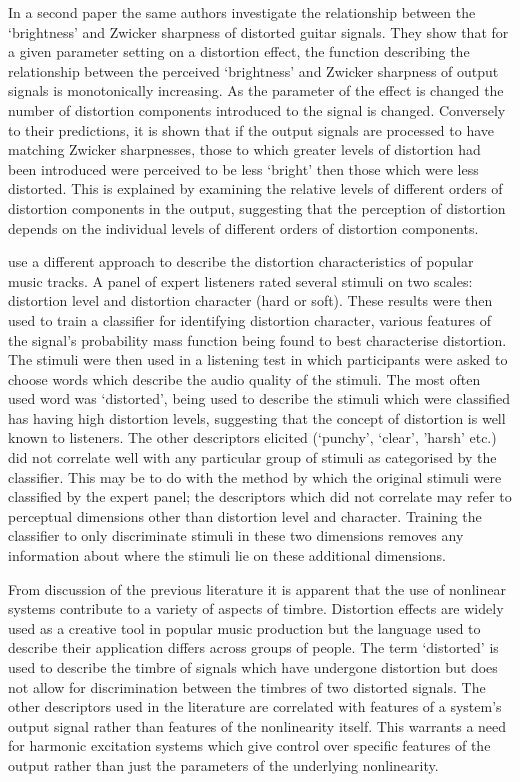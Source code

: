 	In a second paper \citep{tsumoto2016the} the same authors investigate the relationship between the `brightness' and
	Zwicker sharpness of distorted guitar signals. They show that for a given parameter setting on a distortion effect,
	the function describing the relationship between the perceived `brightness' and Zwicker sharpness of output signals
	is monotonically increasing. As the parameter of the effect is changed the number of distortion components
	introduced to the signal is changed. Conversely to their predictions, it is shown that if the output signals are
	processed to have matching Zwicker sharpnesses, those to which greater levels of distortion had been introduced
	were perceived to be less `bright' then those which were less distorted. This is explained by examining the
	relative levels of different orders of distortion components in the output, suggesting that the perception of
	distortion depends on the individual levels of different orders of distortion components.

	\citet{wilson2014characterisation} use a different approach to describe the distortion characteristics of popular
	music tracks. A panel of expert listeners rated several stimuli on two scales: distortion level and distortion
	character (hard or soft). These results were then used to train a classifier for identifying distortion character,
	various features of the signal's probability mass function being found to best characterise distortion. The stimuli
	were then used in a listening test in which participants were asked to choose words which describe the audio
	quality of the stimuli. The most often used word was `distorted', being used to describe the stimuli which were
	classified has having high distortion levels, suggesting that the concept of distortion is well known to listeners.
	The other descriptors elicited (`punchy', `clear', 'harsh' etc.) did not correlate well with any particular group
	of stimuli as categorised by the classifier. This may be to do with the method by which the original stimuli were
	classified by the expert panel; the descriptors which did not correlate may refer to perceptual dimensions other
	than distortion level and character. Training the classifier to only discriminate stimuli in these two dimensions
	removes any information about where the stimuli lie on these additional dimensions.

	From discussion of the previous literature it is apparent that the use of nonlinear systems contribute to a variety
	of aspects of timbre. Distortion effects are widely used as a creative tool in popular music production but the
	language used to describe their application differs across groups of people. The term `distorted' is used to
	describe the timbre of signals which have undergone distortion but does not allow for discrimination between the
	timbres of two distorted signals. The other descriptors used in the literature are correlated with features of a
	system's output signal rather than features of the nonlinearity itself. This warrants a need for harmonic
	excitation systems which give control over specific features of the output rather than just the parameters of the
	underlying nonlinearity. 

